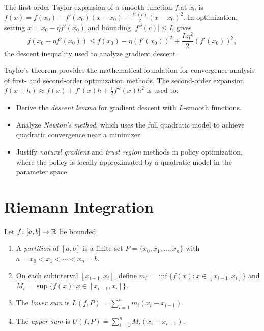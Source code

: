 \documentclass[11pt,a4paper]{article}
\begin{document}
\begin{example}
\label{ex:taylor_quadratic}
The first-order Taylor expansion of a smooth function $f$ at $x_0$ is
$f(x) = f(x_0) + f'(x_0)(x - x_0) + \frac{f''(c)}{2}(x - x_0)^2$.
In optimization, setting $x = x_0 - \eta f'(x_0)$ and bounding
$|f''(c)| \le L$ gives
\[
  f(x_0 - \eta f'(x_0)) \le f(x_0) - \eta (f'(x_0))^2
  + \frac{L\eta^2}{2}(f'(x_0))^2,
\]
the descent inequality used to analyze gradient descent.
\end{example}

\begin{rlconnection}[title={Taylor approximations in optimization convergence}]
Taylor's theorem provides the mathematical foundation for convergence
analysis of first- and second-order optimization methods. The
second-order expansion $f(x + h) \approx f(x) + f'(x)h +
\frac{1}{2}f''(x)h^2$ is used to:
\begin{itemize}[nosep]
  \item Derive the \emph{descent lemma} for gradient descent with
    $L$-smooth functions.
  \item Analyze \emph{Newton's method}, which uses the full quadratic
    model to achieve quadratic convergence near a minimizer.
  \item Justify \emph{natural gradient} and \emph{trust region} methods
    in policy optimization, where the policy is locally approximated by
    a quadratic model in the parameter space.
\end{itemize}
\end{rlconnection}

\section{Riemann Integration}
\label{sec:riemann}

\begin{definition}
\label{def:partition}
Let $f \colon [a, b] \to \mathbb{R}$ be bounded.
\begin{enumerate}[nosep,label=(\roman*)]
  \item A \emph{partition} of $[a, b]$ is a finite set
    $P = \{x_0, x_1, \ldots, x_n\}$ with
    $a = x_0 < x_1 < \cdots < x_n = b$.
  \item On each subinterval $[x_{i-1}, x_i]$, define
    $m_i = \inf\{f(x) : x \in [x_{i-1}, x_i]\}$ and
    $M_i = \sup\{f(x) : x \in [x_{i-1}, x_i]\}$.
  \item The \emph{lower sum} is
    $L(f, P) = \sum_{i=1}^n m_i (x_i - x_{i-1})$.
  \item The \emph{upper sum} is
    $U(f, P) = \sum_{i=1}^n M_i (x_i - x_{i-1})$.
\end{enumerate}
\end{definition}
\end{document}
